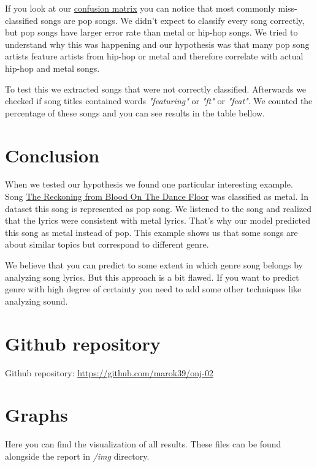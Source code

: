 \documentclass[a4paper,11pt]{article}
\begin{document}
If you look at our \hyperref[label-cf-matrix]{confusion matrix} you can notice that most commonly miss-classified songs are pop songs. We didn't expect to classify every song correctly, but pop songs have larger error rate than metal or hip-hop songs. We tried to understand why this was happening and our hypothesis was that many pop song artists feature artists from hip-hop or metal and therefore correlate with actual hip-hop and metal songs.

To test this we extracted songs that were not correctly classified. Afterwards we checked if song titles contained words \textit{"featuring"} or \textit{"ft"} or \textit{"feat"}. We counted the percentage of these songs and you can see results in the table bellow.


\section{Conclusion}

When we tested our hypothesis we found one particular interesting example. Song \href{https://www.youtube.com/watch?v=iKFYrPH5nRI}{The Reckoning from Blood On The Dance Floor} was classified as metal. In dataset this song is represented as pop song. We listened to the song and realized that the lyrics were consistent with metal lyrics. That's why our model predicted this song as metal instead of pop. This example shows us that some songs are about similar topics but correspond to different genre. 

We believe that you can predict to some extent in which genre song belongs by analyzing song lyrics. But this approach is a bit flawed. If you want to predict genre with high degree of certainty you need to add some other techniques like analyzing sound.


\section{Github repository}
Github repository: \href{https://github.com/marok39/onj-02}{https://github.com/marok39/onj-02}

\pagebreak
\appendix
\appendixpage
\section{\label{label-graphs} Graphs}

Here you can find the visualization of all results. These files can be found alongside the report in \textit{/img} directory.
\end{document}
